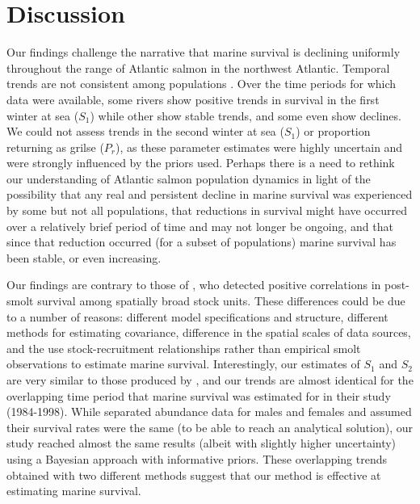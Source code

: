 \documentclass[12pt]{article}
\newcommand{\So}{$S_{1}$\xspace}
\newcommand{\St}{$S_{2}$\xspace}
\newcommand{\Pg}{$P_r$\xspace}
\begin{document}
\section*{Discussion} 


Our findings challenge the narrative that marine survival is declining
uniformly throughout the range of Atlantic salmon in the northwest Atlantic.
Temporal trends are not consistent among populations 
. Over the time periods for which data were available, some rivers show positive trends in survival in the
first winter at sea (\So) while other show stable trends, and some even show
declines. We could not assess trends in the second winter at sea (\So) or
proportion returning as grilse (\Pg), as these parameter estimates were highly
uncertain and were strongly influenced by the priors used.
Perhaps there is a need to rethink our understanding of Atlantic salmon
population dynamics in light of the possibility that any real and persistent decline in marine survival was
experienced by some but not all populations, that reductions in survival might
have occurred over a relatively brief period of time and may not longer be ongoing, and that since that
reduction occurred (for a subset of populations) marine survival has
been stable, or even increasing.

Our findings are contrary to those of \citet{Olmos2019}, who detected positive
correlations in post-smolt survival among spatially broad stock units. These differences
could be due to a number of reasons: different model specifications and
structure, different methods for estimating covariance, difference in the
spatial scales of data sources, and the use stock-recruitment relationships
rather than empirical smolt observations to estimate marine survival.
Interestingly, our estimates of \So and \St are very similar to those produced
by \citet{Chaput2003b}, and our trends are almost identical for the
overlapping time period that marine survival was estimated for in their study
(1984-1998). 
While \citet{Chaput2003b} separated abundance data for males and females
and assumed their survival rates were the same (to be able to reach an
analytical solution), our study reached almost the same results (albeit with
slightly higher uncertainty) using a Bayesian approach with informative
priors. These overlapping trends obtained with two different methods 
suggest that our method is effective at estimating marine survival.
\end{document}
